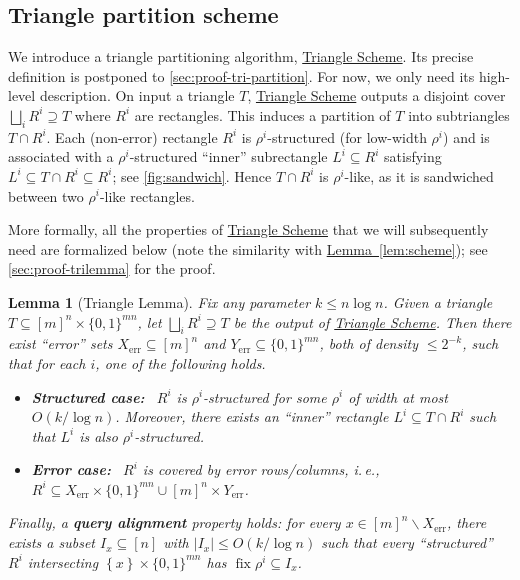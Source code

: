 \documentclass[11pt]{article}
\numberwithin{equation}{section}
\newtheorem{lemma}[theorem]{Lemma}
\theoremstyle{definition}
\theoremstyle{plain}
\newcommand{\ie}{i.\,e.}
\newcommand{\expref}[2]{\hyperref[#2]{#1~\ref{#2}}}
\newcommand{\rectlemma}{\expref{Lemma}{lem:scheme}\xspace}%
\newcommand{\trischeme}{\hyperref[alg:tri-partition]{Triangle Scheme}\xspace}
\DeclareMathOperator{\fix}{fix}
\DeclareMathOperator{\err}{err}
\newcommand{\allX}{[m]^n}
\newcommand{\allY}{\{0,1\}^{mn}}
\newcommand{\set}[1]{\left \{ #1 \right \}}
\begin{document}
\subsection{Triangle partition scheme} \label{sec:trischeme-intro}

We introduce a triangle partitioning algorithm, \trischeme. Its precise definition is postponed to \autoref{sec:proof-tri-partition}. For now, we only need its high-level 
description. %
On input a triangle $T$, \trischeme outputs a disjoint cover $\bigsqcup_i R^i\supseteq T$ where $R^i$ are rectangles. This induces a partition of $T$ into subtriangles $T\cap R^i$. Each (non-error) rectangle $R^i$ is $\rho^i$-structured (for low-width $\rho^i$) and is associated with a $\rho^i$-structured ``inner'' subrectangle $L^i\subseteq R^i$ satisfying $L^i\subseteq T\cap R^i\subseteq R^i$; see \autoref{fig:sandwich}. Hence $T\cap R^i$ is $\rho^i$-like, as it is sandwiched between two $\rho^i$-like rectangles.

More formally, all the properties of \trischeme that we will subsequently need are formalized below (note the similarity with \rectlemma); see \autoref{sec:proof-trilemma} for the proof.

\begin{lemma}[Triangle Lemma]\label{lem:tri-scheme} %
  Fix any parameter $k \le n \log n$. Given a triangle $T\subseteq \allX\times\allY$, let $\bigsqcup_i R^i \supseteq T$ be the output of \trischeme. Then there exist ``error'' sets $X_{\err}\subseteq \allX$ and $Y_{\err}\subseteq\allY$, both of density $\leq 2^{-k}$, such that for each $i$, one of the following
holds. %
\begin{itemize}[label=$\bullet$,itemsep=1mm]
	\item {\bf\slshape Structured case:}~ $R^i$ is $\rho^i$-structured for some $\rho^i$ of width at most $O(k/\log n)$. Moreover, there exists an ``inner'' rectangle $L^i \subseteq T \cap R^i$ such that $L^i$ is also $\rho^i$-structured. 
	\item {\bf\slshape Error case:}~ $R^i$ is covered by error rows/columns, \ie, $R^i\subseteq X_{\err}\times \allY\cup \allX\times Y_{\err}$.
\end{itemize}
Finally, a {\bf\itshape query alignment} property holds: for every $x \in \allX\smallsetminus X_{\err}$, there exists a subset $I_x \subseteq [n]$ with $|I_x| \le O(k/\log n)$ such that every ``structured'' $R^i$ intersecting $\set{x} \times \allY$ has $\fix \rho^i \subseteq I_x$.
\end{lemma}
\end{document}
